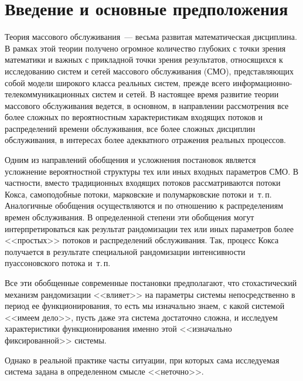 \begin{multicols}{2}


\label{st\stat}


\section{Введение и основные предположения}

Теория массового обслуживания~--- весьма развитая математическая дисциплина. 
В рамках этой теории получено огромное количество глубоких с точки зрения 
математики и важных с прикладной точки зрения результатов, относящихся к
исследованию систем и сетей массового обслуживания (СМО), представляющих 
собой модели широкого класса реальных систем, прежде
всего информационно-телекоммуникационных систем и сетей. 
В настоящее время развитие теории массового обслуживания
ведется, в основном, в на\-прав\-ле\-нии рас\-смот\-ре\-ния все более сложных по вероятностным характеристикам входящих потоков и
распределений времени обслуживания, все более сложных дис\-цип\-лин обслуживания, в интересах более адекватного отражения
реальных процессов.

Одним из направлений обобщения и усложнения постановок является усложнение 
вероятностной структуры тех или иных входных параметров СМО. В частности,  
вместо традиционных входящих потоков рассматриваются потоки Кокса, самоподобные 
потоки, марковские и полумарковские потоки и~т.\,п. Аналогичные обобщения 
осуществляются и по отношению к распределениям времен %
обслу\-жи\-ва\-ния. В 
определенной степени эти обобщения могут интерпретироваться как результат 
рандомизации тех или иных параметров более <<прос\-тых>> потоков и 
распределений обслуживания. Так, процесс Кокса получается в результате 
специальной рандомизации интенсивности пуассоновского потока и~т.\,п.

Все эти обобщенные современные постановки предполагают, что стохастический механизм рандомизации <<влияет>> на
параметры системы непосредственно в период ее функционирования, то есть мы изначально знаем, с какой системой <<имеем
дело>>, пусть даже эта система достаточно сложна, и исследуем характеристики функционирования именно этой <<изначально
фиксированной>> системы. 

Однако в реальной практике часты ситуации, при которых сама исследуемая система задана в
определенном смысле <<неточно>>. 


\end{multicols}
